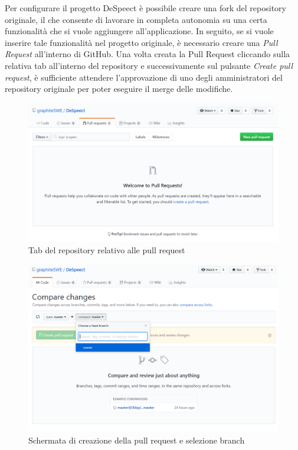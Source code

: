 \documentclass[openany,12pt,a4paper]{report}
\begin{document}
	Per configurare il progetto DeSpeect è possibile creare una fork del repository originale, il che consente di lavorare in completa autonomia su una certa funzionalità che si vuole aggiungere all'applicazione. In seguito, se si vuole inserire tale funzionalità nel progetto originale, è necessario creare una \textit{Pull Request} all'interno di GitHub. Una volta creata la Pull Request cliccando sulla relativa tab all'interno del repository e successivamente sul pulsante \textit{Create pull request}, è sufficiente attendere l'approvazione di uno degli amministratori del repository originale per poter eseguire il merge delle modifiche.
	
	\begin{figure}[H]
		\includegraphics[scale=0.5]{github-new-pull-request}
		\centering
		\caption{Tab del repository relativo alle pull request}
	\end{figure}
	
	\begin{figure}[H]
		\includegraphics[scale=0.5]{github-new-pull-request-branch}
		\centering
		\caption{Schermata di creazione della pull request e selezione branch}
	\end{figure}
\end{document}
